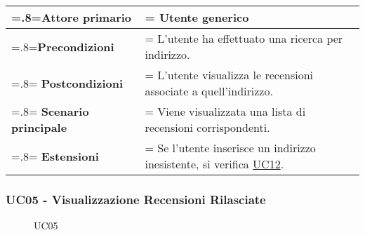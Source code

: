             \begin{center}
                \renewcommand{\arraystretch}{1.5}
                \renewcommand\tabularxcolumn[1]{m{#1}}
                \begin{tabularx}{0.9\textwidth} {
                    >{\hsize=.8\hsize\linewidth=\hsize}X
                    >{\hsize=1.2\hsize\linewidth=\hsize}X}
                    \hline
                    \textbf{Attore primario} & Utente generico \\
                    \hline
                    \textbf{Precondizioni} & L'utente ha effettuato una ricerca per indirizzo. \\
                    \hline
                    \textbf{Postcondizioni} & L'utente visualizza le recensioni associate a quell'indirizzo. \\
                    \hline
                    \textbf{Scenario principale} & Viene visualizzata una lista di recensioni corrispondenti. \\
                    \hline
                    \textbf{Estensioni} & Se l'utente inserisce un indirizzo inesistente, si verifica \hyperref[UC12]{UC12}. \\
                    \hline
                \end{tabularx}
            \end{center}

        \subsubsection{UC05 - Visualizzazione Recensioni Rilasciate}
        \label{UC05}

            \begin{figure}[H]
                \centering
                
                \caption{UC05}
            \end{figure}

